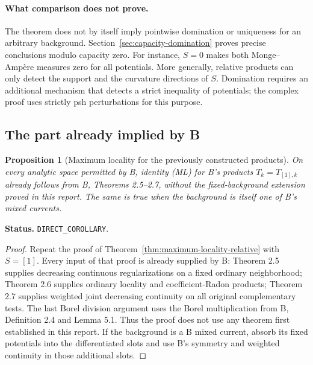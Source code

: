\documentclass[11pt,a4paper]{article}
\numberwithin{equation}{section}
\newtheorem{proposition}[theorem]{Proposition}
\theoremstyle{definition}
\theoremstyle{remark}
\begin{document}
\paragraph{What comparison does not prove.}
The theorem does not by itself imply pointwise domination or uniqueness
for an arbitrary background. Section~\ref{sec:capacity-domination}
proves precise conclusions modulo capacity zero. For instance, \(S=0\) makes both Monge--Amp\`ere measures zero
for all potentials. More generally, relative products can only detect
the support and the curvature directions of \(S\). Domination requires
an additional mechanism that detects a strict inequality of potentials;
the complex proof uses strictly psh perturbations for this purpose.

\subsection{The part already implied by B}
\label{subsec:baseline-maximum-locality}

\begin{proposition}[Maximum locality for the previously constructed products]
On every analytic space permitted by B, identity (ML) for B's products
\(T_k=T_{[1],k}\) already follows from B, Theorems 2.5--2.7, without the
fixed-background extension proved in this report. The same is true when
the background is itself one of B's mixed currents.
\end{proposition}

\noindent\textbf{Status.} \texttt{DIRECT\_COROLLARY}.

\begin{proof}
Repeat the proof of Theorem~\ref{thm:maximum-locality-relative} with
\(S=[1]\). Every input of that proof is already supplied by B:
Theorem 2.5 supplies decreasing continuous regularizations on a fixed
ordinary neighborhood; Theorem 2.6 supplies ordinary locality and
coefficient-Radon products; Theorem 2.7 supplies weighted joint decreasing
continuity on all original complementary tests. The last Borel division
argument uses the Borel multiplication from B, Definition 2.4 and
Lemma 5.1. Thus the proof does not use any theorem first established in
this report. If the background is a B mixed current, absorb its fixed
potentials into the differentiated slots and use B's symmetry and weighted
continuity in those additional slots.
\end{proof}

\end{document}
